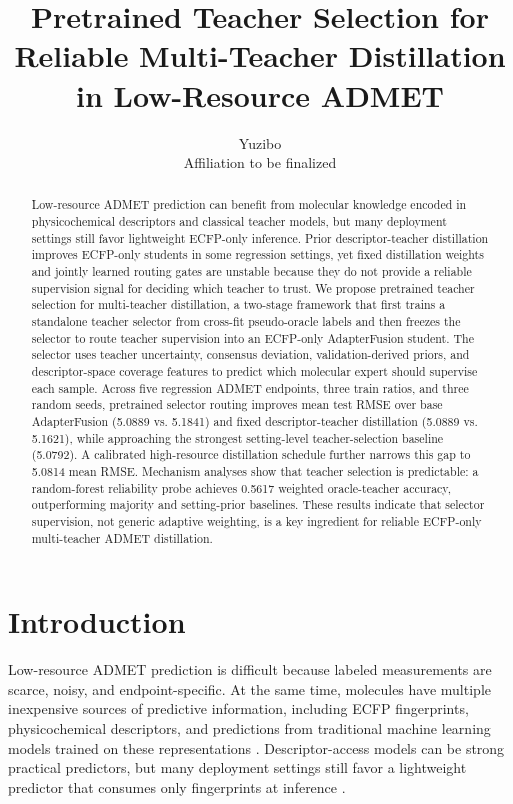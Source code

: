\documentclass[11pt]{article}
\title{Pretrained Teacher Selection for Reliable Multi-Teacher Distillation in Low-Resource ADMET}
\author{Yuzibo\\\small Affiliation to be finalized}
\date{}
\begin{document}
\maketitle

\begin{abstract}
Low-resource ADMET prediction can benefit from molecular knowledge encoded in
physicochemical descriptors and classical teacher models, but many deployment
settings still favor lightweight ECFP-only inference. Prior descriptor-teacher
distillation improves ECFP-only students in some regression settings, yet fixed
distillation weights and jointly learned routing gates are unstable because
they do not provide a reliable supervision signal for deciding which teacher
to trust. We propose pretrained teacher selection for multi-teacher
distillation, a two-stage framework that first trains a standalone teacher
selector from cross-fit pseudo-oracle labels and then freezes the selector to
route teacher supervision into an ECFP-only AdapterFusion student. The selector
uses teacher uncertainty, consensus deviation, validation-derived priors, and
descriptor-space coverage features to predict which molecular expert should
supervise each sample. Across five regression ADMET endpoints, three train
ratios, and three random seeds, pretrained selector routing improves mean test
RMSE over base AdapterFusion (5.0889 vs. 5.1841) and fixed descriptor-teacher
distillation (5.0889 vs. 5.1621), while approaching the strongest setting-level
teacher-selection baseline (5.0792). A calibrated high-resource distillation
schedule further narrows this gap to 5.0814 mean RMSE. Mechanism analyses show
that teacher selection is predictable: a random-forest reliability probe
achieves 0.5617 weighted oracle-teacher accuracy, outperforming majority and
setting-prior baselines. These results indicate that selector supervision, not
generic adaptive weighting, is a key ingredient for reliable ECFP-only
multi-teacher ADMET distillation.
\end{abstract}

\section{Introduction}

Low-resource ADMET prediction is difficult because labeled measurements are
scarce, noisy, and endpoint-specific. At the same time, molecules have
multiple inexpensive sources of predictive information, including ECFP
fingerprints, physicochemical descriptors, and predictions from traditional
machine learning models trained on these representations
\cite{Rogers2010,RDKit2026,Breiman2001,Chen2016XGBoost}. Descriptor-access
models can be strong practical predictors, but many deployment settings still
favor a lightweight predictor that consumes only fingerprints at inference
\cite{Wu2018MoleculeNet,Huang2021TDC,Xiong2021ADMETlab,Swanson2024ADMETAI}.
\end{document}
